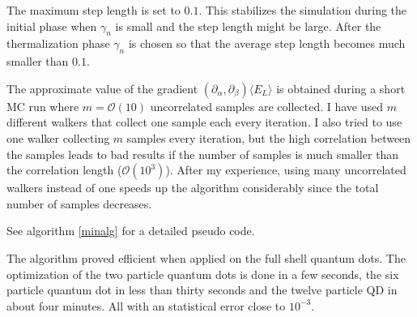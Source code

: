 \documentclass[a4paper,10pt,twocolumn]{article} %
\newcommand{\expec}[1]{\langle{}{#1}\rangle{}}
\begin{document}
The maximum step length is set to $0.1$. This stabilizes the simulation during the initial phase when $\gamma_n$ is small and the step length might be large.
After the thermalization phase $\gamma_n$ is chosen so that the average step length becomes much smaller than $0.1$.

The approximate value of the gradient $\left({\partial_\alpha},{\partial_\beta}\right)\expec{E_L}$ is obtained during a short MC run where $m=\mathcal O (10)$ uncorrelated samples are 
collected. I have used $m$ different walkers that collect one sample each every iteration. 
I also tried to use one walker collecting $m$ samples every iteration, but %
the high correlation between the samples leads to bad results if the number of samples is much smaller than the correlation length ($\mathcal O(10^3)$). 
After my experience, using many uncorrelated walkers instead of one speeds up the algorithm considerably since the total number of samples decreases.


See algorithm \ref{minalg} for a detailed pseudo code.

The algorithm proved efficient when applied on the full shell quantum dots.%
The optimization of the two particle quantum dots is done in a few seconds, the six particle quantum dot in less than thirty seconds and the twelve particle QD in about four minutes.
All with an statistical error close to $10^{-3}$.
\end{document}
